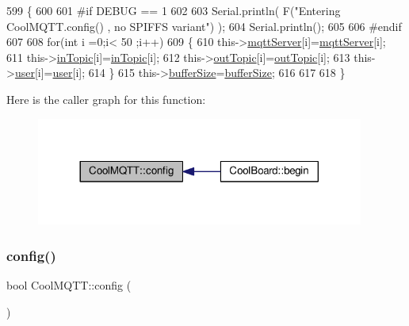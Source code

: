 \begin{DoxyCode}
599 \{
600 
601 \textcolor{preprocessor}{#if DEBUG == 1}
602 
603     Serial.println( F(\textcolor{stringliteral}{"Entering CoolMQTT.config() , no SPIFFS variant"}) );
604     Serial.println();
605 
606 \textcolor{preprocessor}{#endif}
607 
608     \textcolor{keywordflow}{for}(\textcolor{keywordtype}{int} i =0;i< 50 ;i++)
609     \{
610         this->\hyperlink{classCoolMQTT_ab8bb951f87ddbf92db74c2ad16a3e53e}{mqttServer}[i]=\hyperlink{classCoolMQTT_ab8bb951f87ddbf92db74c2ad16a3e53e}{mqttServer}[i];
611         this->\hyperlink{classCoolMQTT_a4492f52a441e83cc5151010317fdb52d}{inTopic}[i]=\hyperlink{classCoolMQTT_a4492f52a441e83cc5151010317fdb52d}{inTopic}[i];
612         this->\hyperlink{classCoolMQTT_a109c786a17b463f9eeba046194279522}{outTopic}[i]=\hyperlink{classCoolMQTT_a109c786a17b463f9eeba046194279522}{outTopic}[i];
613         this->\hyperlink{classCoolMQTT_a8cd47e45d457f908d4b4390b35aaee83}{user}[i]=\hyperlink{classCoolMQTT_a8cd47e45d457f908d4b4390b35aaee83}{user}[i];
614     \}
615     this->\hyperlink{classCoolMQTT_a7f3cf26b51d6770f216e42c5ef13ca9f}{bufferSize}=\hyperlink{classCoolMQTT_a7f3cf26b51d6770f216e42c5ef13ca9f}{bufferSize};
616     
617 
618 \}
\end{DoxyCode}
Here is the caller graph for this function\+:\nopagebreak
\begin{figure}[H]
\begin{center}
\leavevmode
\includegraphics[width=305pt]{classCoolMQTT_a9b703de4f1358f0ee7a5e8c44979c648_icgraph}
\end{center}
\end{figure}
\mbox{\label{classCoolMQTT_a6571671781a505feca9a8a56e256c6bc}} 
\subsubsection{\texorpdfstring{config()}{config()}\hspace{0.1cm}{\footnotesize\ttfamily [2/2]}}
{\footnotesize\ttfamily bool Cool\+M\+Q\+T\+T\+::config (\begin{DoxyParamCaption}{ }\end{DoxyParamCaption})}

